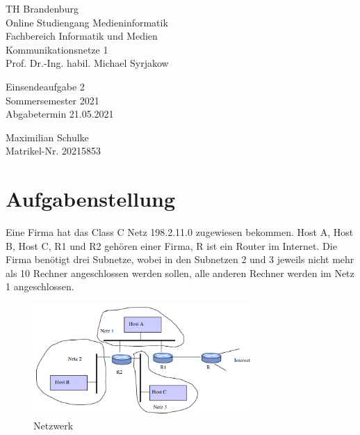 \documentclass{article}
\begin{document}
\begin{titlepage}
	\begin{flushleft}
		TH Brandenburg \\
		Online Studiengang Medieninformatik \\
		Fachbereich Informatik und Medien \\
		Kommunikationsnetze 1 \\
		Prof. Dr.-Ing. habil. Michael Syrjakow
	\end{flushleft}

	\vfill

	\begin{center}
		\Large{Einsendeaufgabe 2}\\[0.5em]
		\large{Sommersemester 2021}\\[0.25em]
		\large{Abgabetermin 21.05.2021}
	\end{center}

	\vfill

	\begin{flushright}
		Maximilian Schulke \\
		Matrikel-Nr. 20215853
	\end{flushright}
\end{titlepage}

\newpage

\section*{Aufgabenstellung}

Eine Firma hat das Class C Netz 198.2.11.0 zugewiesen bekommen. Host A, Host B, Host C, R1 und R2 gehören
einer Firma, R ist ein Router im Internet. Die Firma benötigt drei Subnetze, wobei in den Subnetzen 2 und
3 jeweils nicht mehr als 10 Rechner angeschlossen werden sollen, alle anderen Rechner werden im Netz 1
angeschlossen.

\begin{figure}[ht]
	\includegraphics[width=0.75\textwidth]{plain}
	\centering
	\caption{Netzwerk}
\end{figure}
\end{document}
